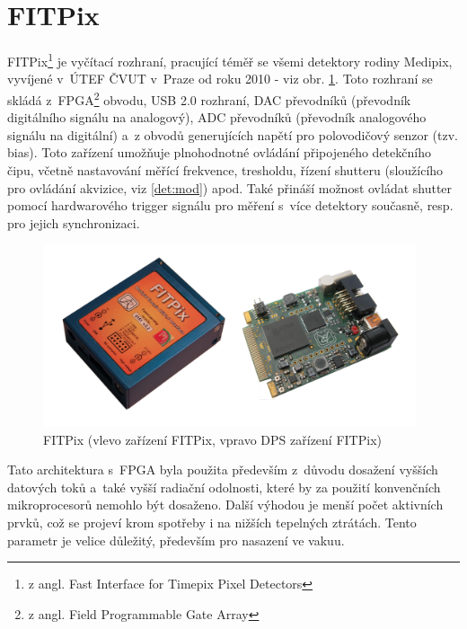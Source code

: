 \section{FITPix}\label{det:fitpix}
FITPix\footnote{z angl. Fast Interface for Timepix Pixel Detectors} \cite{fitpix} je vyčítací rozhraní, pracující téměř se všemi detektory rodiny Medipix, vyvíjené v~ÚTEF ČVUT v~Praze od roku 2010 - viz obr. \ref{fig:det:fitpix}. Toto rozhraní se skládá z~FPGA\footnote{z angl. Field Programmable Gate Array} obvodu, USB 2.0 rozhraní, DAC převodníků (převodník digitálního signálu na analogový), ADC převodníků (převodník analogového signálu na digitální) a~z obvodů generujících napětí pro polovodičový senzor (tzv. bias). Toto zařízení umožňuje plnohodnotné ovládání připojeného detekčního čipu, včetně nastavování měřící frekvence, tresholdu, řízení shutteru (sloužícího pro ovládání akvizice, viz \ref{det:mod}) apod. Také přináší možnost ovládat shutter pomocí hardwarového trigger signálu pro měření s~více detektory současně, resp. pro jejich synchronizaci.

\begin{figure}[th!]
	\begin{center}
		\includegraphics[width=11cm]{figures/fitpix.png}
		\caption{FITPix (vlevo zařízení FITPix, vpravo DPS zařízení FITPix)}
		\label{fig:det:fitpix}
	\end{center}
\end{figure}

Tato architektura s~FPGA byla použita především z~důvodu dosažení vyšších datových toků a~také vyšší radiační odolnosti, které by za použití konvenčních mikroprocesorů nemohlo být dosaženo. Další výhodou je menší počet aktivních prvků, což se projeví krom spotřeby i na nižších tepelných ztrátách. Tento parametr je velice důležitý, především pro nasazení ve vakuu.

